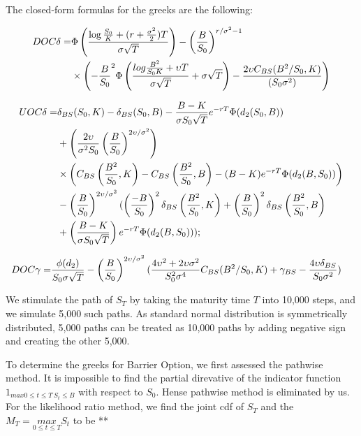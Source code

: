 \documentclass[12pt,a4paper,fleqn]{article}
\begin{document}
The closed-form formulas for the greeks are the following:

\begin{align*}
DOC\delta =& \Phi\left({\log{S_0 \over K} + (r + {\sigma^2 \over 2})T \over \sigma\sqrt{T}}\right)- \left({B\over S_0}\right)^{r /\sigma^2 - 1}\\
&\times \left(-{B\over S_0}^2 \Phi\left({log{B^2 \over S_0K} + \upsilon T \over \sigma \sqrt{T}} + \sigma \sqrt{T}\right) - {2 \upsilon C_{BS}(B^2 / S_0, K) \over (S_0\sigma^2)}\right)
\end{align*}

\begin{align*}
UOC\delta =& \delta_{BS}(S_0, K) - \delta_{BS}(S_0, B)-{B - K\over \sigma S_0 \sqrt{T}}e^{-rT}\Phi(d_2(S_0,B))\\
&+ \left({2\upsilon\over \sigma^2 S_0} \left({B \over S_0}\right)^{ 2\upsilon / \sigma^2} \right)\\
&\times \left(C_{BS}\left({B^2 \over S_0}, K\right) - C_{BS}\left({B^2\over S_0}, B\right) - (B - K)e^{-rT}\Phi(d_2(B, S_0))\right)\\
&-\left({B \over S_0}\right)^{ 2\upsilon / \sigma^2}(\left({-B \over S_0}\right)^2\delta_{BS}\left({B^2 \over S_0}, K\right) + \left({B\over S_0}\right)^2\delta_{BS}\left({B^2 \over S_0}, B\right)\\
&+ \left({B - K \over \sigma S_0\sqrt{T}}\right)e^{-rT}\Phi(d_2(B, S_0)));
\end{align*}

\begin{align*}
DOC\gamma =& {\phi(d_2) \over S_0\sigma\sqrt{T}}- \left({B \over S_0}\right)^{ 2\upsilon / \sigma^2}({4\upsilon^2 +2\upsilon \sigma^2\over S_0^2\sigma^4}C_{BS}(B^2 / S_0, K) + \gamma_{BS} - {4\upsilon\delta_{BS} \over S_0\sigma^2})
\end{align*}

We stimulate the path of $S_T$ by taking the maturity time $T$ into 10,000 steps, and we simulate 5,000 such paths. As standard normal distribution is symmetrically distributed, 5,000 paths can be treated as 10,000 paths by adding negative sign and creating the other 5,000.

To determine the greeks for Barrier Option, we first assessed the pathwise method. It is impossible to find the partial direvative of the indicator function $1_{max 0\leq t\leq T \  S_t\leq B}$  with respect to $S_0$. Hense pathwise method is eliminated by us. For the likelihood ratio method, we find the joint cdf of $S_T$ and the  $M_T = \underset{0 \leq t \leq T}{max} S_t$ to be **
\end{document}
